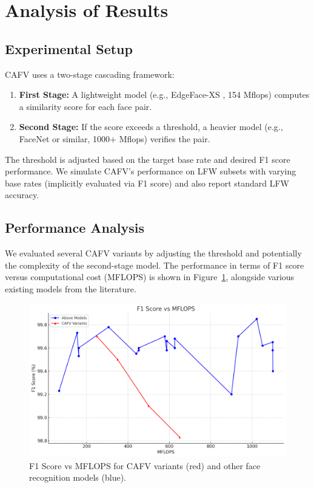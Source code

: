 \documentclass[times,10pt,twocolumn]{article}
\begin{document}
\section{Analysis of Results}

\subsection{Experimental Setup}
CAFV uses a two-stage cascading framework:
\begin{enumerate}
    \item \textbf{First Stage:} A lightweight model (e.g., EdgeFace-XS \cite{edgeface2023}, 154 Mflops) computes a similarity score for each face pair.
    \item \textbf{Second Stage:} If the score exceeds a threshold, a heavier model (e.g., FaceNet \cite{facenet} or similar, 1000+ Mflops) verifies the pair.
\end{enumerate}

The threshold is adjusted based on the target base rate and desired F1 score performance. We simulate CAFV's performance on LFW subsets with varying base rates (implicitly evaluated via F1 score) and also report standard LFW accuracy.

\subsection{Performance Analysis}
We evaluated several CAFV variants by adjusting the threshold and potentially the complexity of the second-stage model. The performance in terms of F1 score versus computational cost (MFLOPS) is shown in Figure~\ref{fig:f1_vs_mflops}, alongside various existing models from the literature.

\begin{figure}[h!tbp]
  \centering
  \includegraphics[width=\columnwidth]{output.png} %
  \caption{F1 Score vs MFLOPS for CAFV variants (red) and other face recognition models (blue).}
  \label{fig:f1_vs_mflops}
\end{figure}
\end{document}
